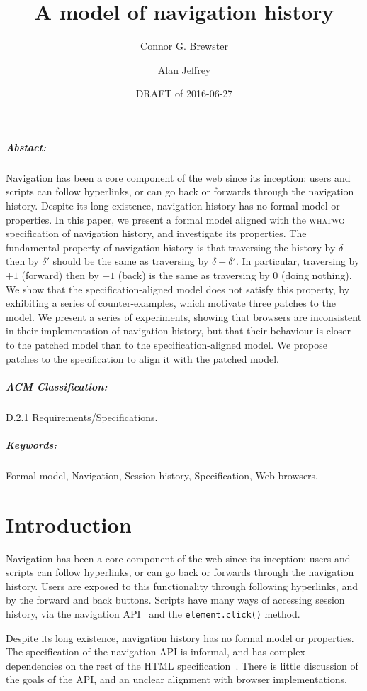 \documentclass{notes}
\title{A model of navigation history}
\author{Connor G. Brewster \and Alan Jeffrey}
\date{DRAFT of 2016-06-27}
\begin{document}
\maketitle

\subparagraph{Abstact:}
Navigation has been a core component of the web since its inception:
users and scripts can follow hyperlinks, or can go back or forwards
through the navigation history. Despite its long existence, navigation
history has no formal model or properties. In this paper, we present a
formal model aligned with the \textsc{whatwg} specification of navigation
history, and investigate its properties. The fundamental property of
navigation history is that traversing the history by $\delta$
then by $\delta'$ should be the same as traversing by
$\delta+\delta'$. In particular, traversing by $+1$ (forward) then by
$-1$ (back) is the same as traversing by $0$ (doing nothing). We show
that the specification-aligned model does not satisfy this property,
by exhibiting a series of counter-examples, which motivate three
patches to the model. We present a
series of experiments, showing that browsers are inconsistent in their
implementation of navigation history, but that their behaviour is
closer to the patched model than to the specification-aligned
model. We propose patches to the specification to align it with the
patched model.

\subparagraph{ACM Classification:}
D.2.1 Requirements/Specifications.

\subparagraph{Keywords:}
Formal model,
Navigation,
Session history,
Specification,
Web browsers.

\section{Introduction}

Navigation has been a core component of the web since its inception:
users and scripts can follow hyperlinks, or can go back or forwards
through the navigation history. Users are exposed to this functionality
through following hyperlinks, and by the forward and back buttons.
Scripts have many ways of accessing session history, via the
navigation API~\cite[\S7.7]{whatwg} and the \verb|element.click()| method.

Despite its long existence, navigation history has no formal model or
properties. The specification of the navigation API is informal, and
has complex dependencies on the rest of the HTML
specification~\cite{whatwg}. There is little discussion of the goals
of the API, and an unclear alignment with browser implementations.
\end{document}
